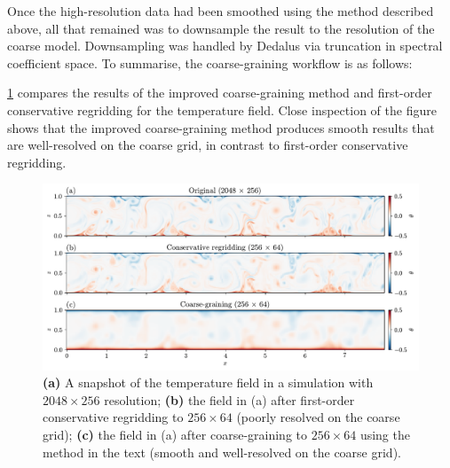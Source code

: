 \documentclass[../main.tex]{subfiles}
\begin{document}
Once the high-resolution data had been smoothed using the method described
above, all that remained was to downsample the result to the resolution of the
coarse model. Downsampling was handled by Dedalus via truncation in spectral
coefficient space. To summarise, the coarse-graining workflow is as follows:

\cref{fig:coarse_graining_example} compares the results of the improved
coarse-graining method and first-order conservative regridding for the
temperature field. Close inspection of the figure shows that the improved
coarse-graining method produces smooth results that are well-resolved on the
coarse grid, in contrast to first-order conservative regridding.

\begin{figure}[ht]
    \centering
    \includegraphics[width=\linewidth]{figures/coarse_graining_example.pdf}
    \caption{
        \textbf{(a)} A snapshot of the temperature field in a simulation with
        $2048 \times 256$ resolution; \textbf{(b)} the field in (a) after
        first-order conservative regridding to $256 \times 64$ (poorly
        resolved on the coarse grid); \textbf{(c)} the field in (a) after
        coarse-graining to $256 \times 64$ using the method in the text
        (smooth and well-resolved on the coarse grid).
    }
    \label{fig:coarse_graining_example}
\end{figure}
\end{document}
